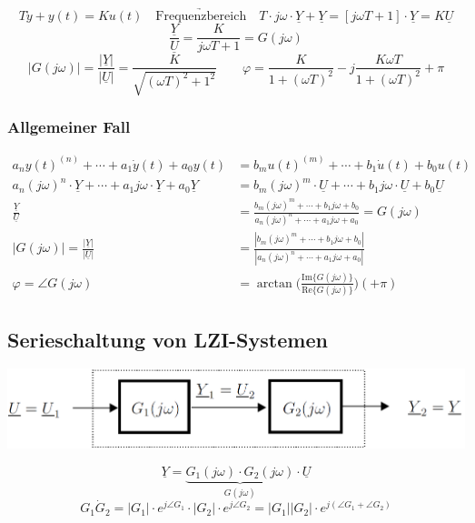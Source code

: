
\vspace{-0.3cm} %
$$ T \dot{y} + y(t) = K u(t) \quad \underrightarrow{\text{Frequenzbereich}} \quad 
T \cdot j \omega \cdot \underline{Y} + \underline{Y} = [j \omega T + 1] \cdot \underline{Y} = K \underline{U} $$
$$ \frac{\underline{Y}}{\underline{U}} = \frac{K}{j \omega T + 1} = G(j \omega) $$
$$ |G(j \omega)| = \frac{|\underline{Y}|}{|\underline{U}|} = \frac{K}{\sqrt{(\omega T)^2 + 1^2}} \qquad \varphi = \frac{K}{1 + (\omega T)^2} - j \frac{K \omega T}{1 + (\omega T)^2 } + \pi $$


\subsubsection{Allgemeiner Fall}


\vspace{-0.5cm} %
\begin{align*}
    a_n y(t)^{(n)} + \cdots  + a_1 \dot{y}(t) + a_0 y(t) &= b_m u(t)^{(m)} + \cdots + b_1 \dot{u}(t) + b_0 u(t) \\
    a_n (j \omega)^n \cdot \underline{Y} + \cdots + a_1 j \omega \cdot \underline{Y} + a_0 \underline{Y} 
    &=  b_m (j \omega)^m \cdot \underline{U} + \cdots + b_1 j \omega \cdot \underline{U} + b_0 \underline{U} \\
    \frac{\underline{Y}}{\underline{U}} 
    &= \frac{b_m (j \omega)^m + \cdots + b_1 j \omega + b_0}{a_n (j \omega)^n + \cdots + a_1 j \omega + a_0} = G(j \omega) \\
    |G(j \omega)| = \frac{|\underline{Y}|}{|\underline{U}|}
    &= \frac{| b_m (j \omega)^m + \cdots + b_1 j \omega + b_0 |}{| a_n (j \omega)^n + \cdots + a_1 j \omega + a_0 |} \\
    \varphi = \angle G(j \omega) &= \arctan \Big( \frac{\mathrm{Im} \{G(j \omega)\}}{\mathrm{Re}\{G(j \omega)\}} \Big) (+ \pi)
\end{align*}




\subsection{Serieschaltung von LZI-Systemen}

\begin{center}
    \includegraphics[width=0.7\columnwidth]{images/frequenzgang_serieschaltung.png}
\end{center}
$$ \boxed{ \underline{Y} = \underbrace{G_1(j \omega) \cdot G_2(j \omega)}_{G(j \omega)} \cdot \underline{U} } $$
$$ G_1 \dot G_2 = |G_1| \cdot e^{j \angle G_1} \cdot |G_2| \cdot e^{j \angle G_2} = |G_1| |G_2| \cdot e^{j (\angle G_1 + \angle G_2)} $$


